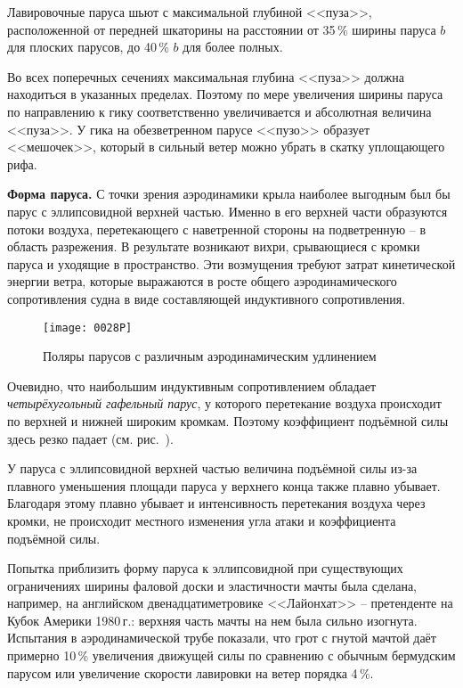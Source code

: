 Лавировочные паруса шьют с максимальной глубиной <<пуза>>,
расположенной от передней шкаторины на расстоянии от 35\,\%
ширины паруса $b$ для плоских парусов, до 40\,\% $b$ для более
полных.

Во всех поперечных сечениях максимальная глубина <<пуза>> должна
находиться в указанных пределах. Поэтому по мере увеличения ширины
паруса по направлению к гику соответственно увеличивается и абсолютная
величина <<пуза>>. У гика на обезветренном парусе <<пузо>> образует
<<мешочек>>, который в сильный ветер можно убрать в скатку уплощающего
рифа.

\textbf{Форма паруса.} С точки зрения аэродинамики
крыла наиболее выгодным был бы парус с эллипсовидной верхней
частью. Именно в его верхней части образуются потоки воздуха,
перетекающего с наветренной стороны на подветренную \--- в область
разрежения. В результате возникают вихри, срывающиеся с кромки паруса
и уходящие в пространство. Эти возмущения требуют затрат кинетической
энергии ветра, которые выражаются в росте общего аэродинамического
сопротивления судна в виде составляющей индуктивного сопротивления.

\begin{figure}[htb]
  \centering
  \texttt{[image: 0028P]}
  \caption{Поляры парусов с различным аэродинамическим удлинением}
  \label{fig:28}
\end{figure}

Очевидно, что наибольшим индуктивным сопротивлением обладает
\textit{четырёхугольный гафельный парус}, у
которого перетекание воздуха происходит по верхней и нижней широким
кромкам. Поэтому коэффициент подъёмной силы здесь резко падает
(см. рис.~).

У паруса с эллипсовидной верхней частью величина подъёмной силы из-за
плавного уменьшения площади паруса у верхнего конца также плавно
убывает. Благодаря этому плавно убывает и интенсивность перетекания
воздуха через кромки, не происходит местного изменения угла атаки и
коэффициента подъёмной силы.

Попытка приблизить форму паруса к эллипсовидной при существующих
ограничениях ширины фаловой доски и эластичности мачты была сделана,
например, на английском двенадцатиметровике <<Лайонхат>> \---
претенденте на Кубок Америки 1980\,г.: верхняя часть мачты на нем была
сильно изогнута. Испытания в аэродинамической трубе показали, что грот
с гнутой мачтой даёт примерно 10\,\% увеличения движущей силы
по сравнению с обычным бермудским парусом или увеличение скорости
лавировки на ветер порядка 4\,\%.
 
